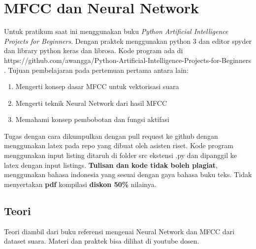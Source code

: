 \chapter{MFCC dan Neural Network}

Untuk pratikum saat ini menggunakan buku \textit{Python Artificial Intelligence Projects for Beginners}\cite{eckroth2018python}. Dengan praktek menggunakan python 3 dan editor spyder dan library python keras dan librosa.
Kode program ada di https://github.com/awangga/Python-Artificial-Intelligence-Projects-for-Beginners .
Tujuan pembelajaran pada pertemuan pertama antara lain:
\begin{enumerate}
\item
Mengerti konsep dasar MFCC untuk vektorisasi suara
\item
Mengerti teknik Neural Network dari hasil MFCC
\item
Memahami konsep pembobotan dan fungsi aktifasi
\end{enumerate}

Tugas dengan cara dikumpulkan dengan pull request ke github dengan menggunakan latex pada repo yang dibuat oleh asisten riset. Kode program menggunakan input listing ditaruh di folder src ekstensi .py dan dipanggil ke latex dengan input listings. \textbf{Tulisan dan kode tidak boleh plagiat}, menggunakan bahasa indonesia yang sesuai dengan gaya bahasa buku teks. Tidak menyertakan \textbf{pdf} kompilasi \textbf{diskon 50\%} nilainya.

\section{Teori}
Teori diambil dari buku referensi mengenai Neural Network dan MFCC dari dataset suara. Materi dan praktek bisa dilihat di youtube dosen.


